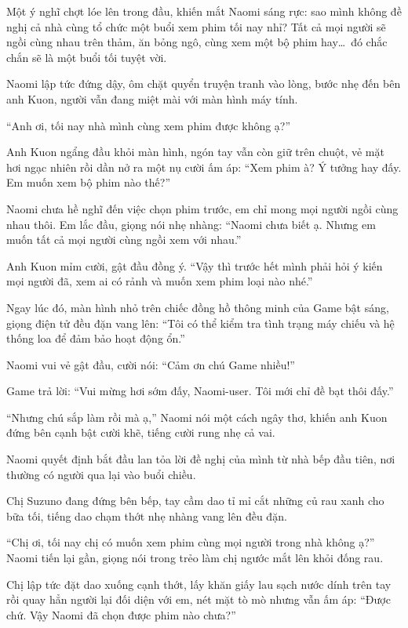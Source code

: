\documentclass[../main.tex]{subfiles}
\begin{document}
Một ý nghĩ chợt lóe lên trong đầu, khiến mắt Naomi sáng rực: sao mình không đề nghị cả nhà cùng tổ chức một buổi xem phim tối nay nhỉ? Tất cả mọi người sẽ ngồi cùng nhau trên thảm, ăn bỏng ngô, cùng xem một bộ phim hay\dots\ đó chắc chắn sẽ là một buổi tối tuyệt vời.

Naomi lập tức đứng dậy, ôm chặt quyển truyện tranh vào lòng, bước nhẹ đến bên anh Kuon, người vẫn đang miệt mài với màn hình máy tính.

``Anh ơi, tối nay nhà mình cùng xem phim được không ạ?''

Anh Kuon ngẩng đầu khỏi màn hình, ngón tay vẫn còn giữ trên chuột, vẻ mặt hơi ngạc nhiên rồi dần nở ra một nụ cười ấm áp: ``Xem phim à? Ý tưởng hay đấy. Em muốn xem bộ phim nào thế?''

Naomi chưa hề nghĩ đến việc chọn phim trước, em chỉ mong mọi người ngồi cùng nhau thôi. Em lắc đầu, giọng nói nhẹ nhàng: ``Naomi chưa biết ạ. Nhưng em muốn tất cả mọi người cùng ngồi xem với nhau.''

Anh Kuon mỉm cười, gật đầu đồng ý. ``Vậy thì trước hết mình phải hỏi ý kiến mọi người đã, xem ai có rảnh và muốn xem phim loại nào nhé.''

Ngay lúc đó, màn hình nhỏ trên chiếc đồng hồ thông minh của Game bật sáng, giọng điện tử đều đặn vang lên: ``Tôi có thể kiểm tra tình trạng máy chiếu và hệ thống loa để đảm bảo hoạt động ổn.''

Naomi vui vẻ gật đầu, cười nói: ``Cảm ơn chú Game nhiều!''

Game trả lời: ``Vui mừng hơi sớm đấy, Naomi-user. Tôi mới chỉ đề bạt thôi đấy.''

``Nhưng chú sắp làm rồi mà ạ,'' Naomi nói một cách ngây thơ, khiến anh Kuon đứng bên cạnh bật cười khẽ, tiếng cười rung nhẹ cả vai.

\ct

Naomi quyết định bắt đầu lan tỏa lời đề nghị của mình từ nhà bếp đầu tiên, nơi thường có người qua lại vào buổi chiều.

Chị Suzuno đang đứng bên bếp, tay cầm dao tỉ mỉ cắt những củ rau xanh cho bữa tối, tiếng dao chạm thớt nhẹ nhàng vang lên đều đặn.

``Chị ơi, tối nay chị có muốn xem phim cùng mọi người trong nhà không ạ?'' Naomi tiến lại gần, giọng nói trong trẻo làm chị ngước mắt lên khỏi đống rau.

Chị lập tức đặt dao xuống cạnh thớt, lấy khăn giấy lau sạch nước dính trên tay rồi quay hẳn người lại đối diện với em, nét mặt tò mò nhưng vẫn ấm áp: ``Được chứ. Vậy Naomi đã chọn được phim nào chưa?''
\end{document}
